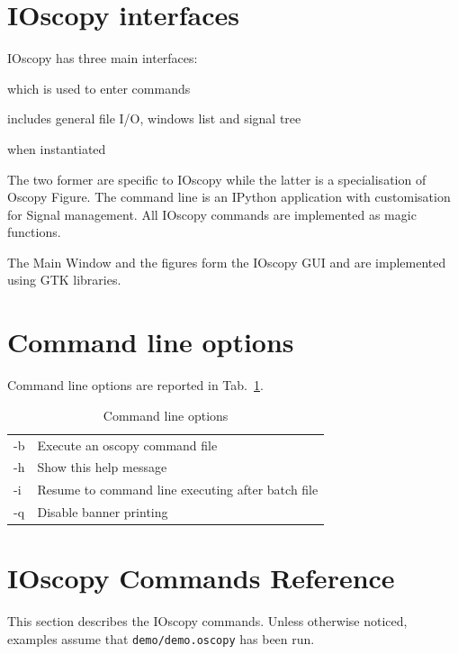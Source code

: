 \documentclass[a4paper,11pt]{report}
\renewenvironment{description}{%
\begin{basedescript}{%
\renewcommand{\makelabel}[1]{\bfseries##1}%
}%
}{%
\end{basedescript}%
}
\begin{document}
\section{IOscopy interfaces}
IOscopy has three main interfaces:
\begin{description}
\item[The command line] which is used to enter commands
\item[The Main Window] includes general file I/O, windows list and signal tree
\item[The figures] when instantiated
\end{description}
The two former are specific to IOscopy while the latter is a specialisation of Oscopy Figure.
The command line is an IPython application with customisation for Signal management.
All IOscopy commands are implemented as magic functions.

The Main Window and the figures form the IOscopy GUI and are implemented using GTK libraries.

\section{Command line options}
Command line options are reported in Tab.~\ref{tab:clio}.
\begin{table}[htbp]
  \centering\sf
  \begin{tabular}{ll}
    \hline
   -b&	Execute an oscopy command file\\
   -h&	Show this help message\\
   -i&	Resume to command line executing after batch file\\
   -q&	Disable banner printing\\
   \hline
  \end{tabular}
  \caption{Command line options}
  \label{tab:clio}
\end{table}
\section{IOscopy Commands Reference}
This section describes the IOscopy commands. Unless otherwise noticed, examples assume that \texttt{demo/demo.oscopy} has been run.

\newcommand{\ocmd}[2]{\vspace{3eX}\noindent\fbox{\begin{minipage}{\linewidth}\large\noindent\textbf{#1} #2\end{minipage}}\vspace{1eX}}
\end{document}
